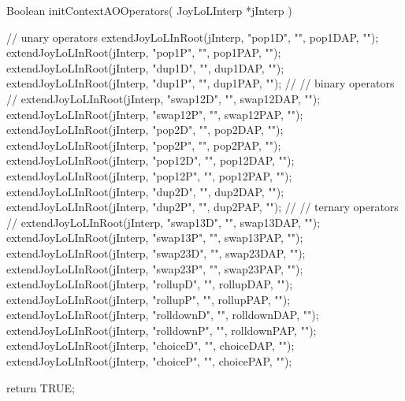\startCCode
Boolean initContextAOOperators(
  JoyLoLInterp *jInterp
) {
  // unary operators
  extendJoyLoLInRoot(jInterp, "pop1D", "", pop1DAP, "");
  extendJoyLoLInRoot(jInterp, "pop1P", "", pop1PAP, "");
  extendJoyLoLInRoot(jInterp, "dup1D", "", dup1DAP, "");
  extendJoyLoLInRoot(jInterp, "dup1P", "", dup1PAP, "");
  //
  // binary operators
  //
  extendJoyLoLInRoot(jInterp, "swap12D", "", swap12DAP, "");
  extendJoyLoLInRoot(jInterp, "swap12P", "", swap12PAP, "");
  extendJoyLoLInRoot(jInterp, "pop2D",   "", pop2DAP,   "");
  extendJoyLoLInRoot(jInterp, "pop2P",   "", pop2PAP,   "");
  extendJoyLoLInRoot(jInterp, "pop12D",  "", pop12DAP,  "");
  extendJoyLoLInRoot(jInterp, "pop12P",  "", pop12PAP,  "");
  extendJoyLoLInRoot(jInterp, "dup2D",   "", dup2DAP,   "");
  extendJoyLoLInRoot(jInterp, "dup2P",   "", dup2PAP,   "");
  //
  // ternary operators
  //
  extendJoyLoLInRoot(jInterp, "swap13D",   "", swap13DAP,   "");
  extendJoyLoLInRoot(jInterp, "swap13P",   "", swap13PAP,   "");
  extendJoyLoLInRoot(jInterp, "swap23D",   "", swap23DAP,   "");
  extendJoyLoLInRoot(jInterp, "swap23P",   "", swap23PAP,   "");
  extendJoyLoLInRoot(jInterp, "rollupD",   "", rollupDAP,   "");
  extendJoyLoLInRoot(jInterp, "rollupP",   "", rollupPAP,   "");
  extendJoyLoLInRoot(jInterp, "rolldownD", "", rolldownDAP, "");
  extendJoyLoLInRoot(jInterp, "rolldownP", "", rolldownPAP, "");
  extendJoyLoLInRoot(jInterp, "choiceD",   "", choiceDAP,   "");
  extendJoyLoLInRoot(jInterp, "choiceP",   "", choicePAP,   "");
  
  return TRUE;
}
\stopCCode
